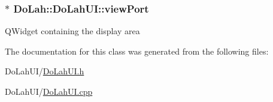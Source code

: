 \subsubsection[{view\+Port}]{$\ast$ Do\+Lah\+::\+Do\+Lah\+U\+I\+::view\+Port}\label{class_do_lah_1_1_do_lah_u_i_ad9a8bde1c82bdda188e9c545cfe42bd3}
Q\+Widget containing the display area 

The documentation for this class was generated from the following files\+:\begin{DoxyCompactItemize}
\item 
Do\+Lah\+U\+I/\hyperlink{_do_lah_u_i_8h}{Do\+Lah\+U\+I.\+h}\item 
Do\+Lah\+U\+I/\hyperlink{_do_lah_u_i_8cpp}{Do\+Lah\+U\+I.\+cpp}\end{DoxyCompactItemize}
